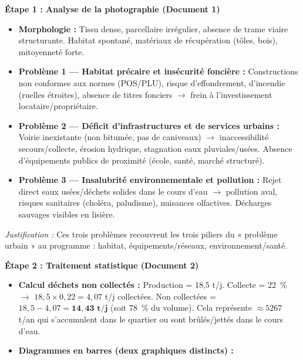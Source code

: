 \documentclass[11pt]{article}
\newcommand{\cle}[1]{{\popxbold\color{popdark}#1}}
\begin{document}
\begin{exoresolu}

\textbf{Étape 1 : Analyse de la photographie (Document 1)}
\begin{itemize}
    \item \textbf{Morphologie :} Tissu dense, parcellaire irrégulier, absence de trame viaire structurante. Habitat spontané, matériaux de récupération (tôles, bois), mitoyenneté forte.
    \item \textbf{Problème 1 — \cle{Habitat précaire} et insécurité foncière :} Constructions non conformes aux normes (POS/PLU), risque d'effondrement, d'incendie (ruelles étroites), absence de titres fonciers $\rightarrow$ frein à l'investissement locataire/propriétaire.
    \item \textbf{Problème 2 — Déficit d'infrastructures et de services urbains :} Voirie inexistante (non bitumée, pas de caniveaux) $\rightarrow$ inaccessibilité secours/collecte, érosion hydrique, stagnation eaux pluviales/usées. Absence d'équipements publics de proximité (école, santé, marché structuré).
    \item \textbf{Problème 3 — \cle{Insalubrité} environnementale et pollution :} Rejet direct eaux usées/déchets solides dans le cours d'eau $\rightarrow$ pollution aval, risques sanitaires (choléra, paludisme), nuisances olfactives. Décharges sauvages visibles en lisière.
\end{itemize}
\emph{Justification :} Ces trois problèmes recouvrent les trois piliers du « problème urbain » au programme : habitat, équipements/réseaux, environnement/santé.

\textbf{Étape 2 : Traitement statistique (Document 2)}
\begin{itemize}
    \item \textbf{Calcul déchets non collectés :} Production = 18,5 t/j. Collecte = 22~\% $\rightarrow$ $18,5 \times 0,22 = 4,07$ t/j collectées. Non collectées = $18,5 - 4,07 = \mathbf{14,43 \text{ t/j}}$ (soit 78~\% du volume). Cela représente $\approx \num{5 267}$ t/an qui s'accumulent dans le quartier ou sont brûlés/jettés dans le cours d'eau.
    \item \textbf{Diagrammes en barres (deux graphiques distincts) :}
\end{itemize}


\end{exoresolu}
\end{document}
